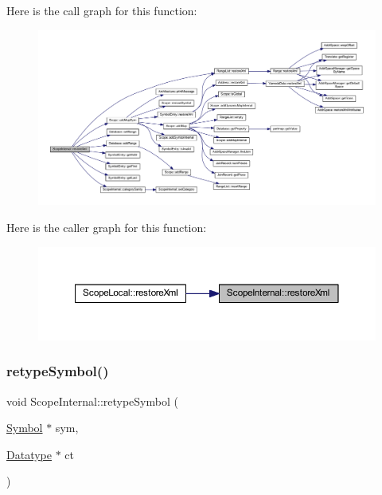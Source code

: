 Here is the call graph for this function\+:
\nopagebreak
\begin{figure}[H]
\begin{center}
\leavevmode
\includegraphics[width=350pt]{class_scope_internal_ad79bd78299b2bea6c0f4221682e81b07_cgraph}
\end{center}
\end{figure}
Here is the caller graph for this function\+:
\nopagebreak
\begin{figure}[H]
\begin{center}
\leavevmode
\includegraphics[width=350pt]{class_scope_internal_ad79bd78299b2bea6c0f4221682e81b07_icgraph}
\end{center}
\end{figure}
\mbox{\label{class_scope_internal_a9711a8084e1ac5c4417a4452c96a36b7}} 
\subsubsection{\texorpdfstring{retypeSymbol()}{retypeSymbol()}}
{\footnotesize\ttfamily void Scope\+Internal\+::retype\+Symbol (\begin{DoxyParamCaption}\item[{\mbox{\hyperlink{class_symbol}{Symbol}} $\ast$}]{sym,  }\item[{\mbox{\hyperlink{class_datatype}{Datatype}} $\ast$}]{ct }\end{DoxyParamCaption})\hspace{0.3cm}{\ttfamily [virtual]}}



